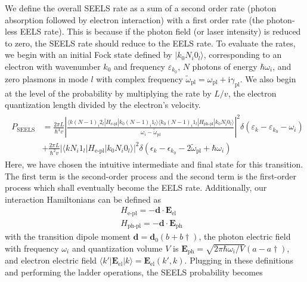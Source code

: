 \documentclass [11pt, proquest] {uwthesis}[2016/11/22]
\begin{document}
We define the overall SEELS rate as a sum of a second order rate (photon absorption followed by electron interaction) with a first order rate (the photon-less EELS rate). This is because if the photon field (or laser intensity) is reduced to zero, the SEELS rate should reduce to the EELS rate. To evaluate the rates, we begin with an initial Fock state defined by $|k_0N_i0_l\rangle$, corresponding to an electron with wavenumber $k_0$ and frequency $\varepsilon_{k_0}$, $N$ photons of energy $\hbar\omega_i$, and zero plasmons in mode $l$ with complex frequency $\tilde{\omega}_{\textrm{pl}}=\omega_{\textrm{pl}}+\textrm{i}\gamma_{\textrm{pl}}$. We also begin at the level of the probability by multiplying the rate by $L/v$, the electron quantization length divided by the electron's velocity.
\begin{align}
\begin{split}
  P_{\textrm{SEELS}} &= \frac{2\pi L}{\hbar^4v}\left|\frac{\langle k(N-1)_i2_l|H_{\textrm{e-pl}}|k_0(N-1)_i1_l\rangle\langle k_0(N-1)_i1_l|H_{\textrm{ph-pl}}|k_0N_i0_l\rangle}{\omega_i - \tilde{\omega}_{\textrm{pl}}}\right|^2\delta(\varepsilon_k - \varepsilon_{k_0}-\omega_i)\\
  &+ \frac{2\pi L}{\hbar^2v}|\langle kN_i1_l|H_{\textrm{e-pl}}|k_0N_i0_l\rangle|^2\delta(\epsilon_k - \epsilon_{k_0} - 2\tilde{\omega}_{\textrm{pl}} + \hbar\omega_i)
  \label{overall_rate}
  \end{split}
\end{align}
Here, we have chosen the intuitive intermediate and final state for this transition. The first term is the second-order process and the second term is the first-order process which shall eventually become the EELS rate. Additionally, our interaction Hamiltonians can be defined as
\begin{equation}
\begin{aligned}
H_{\textrm{e-pl}} = -\textbf{d} \cdot \textbf{E}_{\textrm{el}}&\\
H_{\textrm{ph-pl}} = -\textbf{d} \cdot \textbf{E}_{\textrm{ph}}&
\end{aligned}
\end{equation}
with the transition dipole moment $\textbf{d} = \textbf{d}_0(b + b\dagger)$, the photon electric field with frequency $\omega_i$ and quantization volume $V$ is $\textbf{E}_{\textrm{ph}} = \sqrt{2\pi\hbar\omega_i/V}(a - a\dagger)$, and electron electric field $\langle k'|\textbf{E}_{\textrm{el}}|k\rangle = \textbf{E}_{\textrm{el}}(k',k)$. Plugging in these definitions and performing the ladder operations, the SEELS probability becomes
\end{document}
